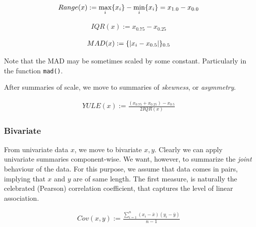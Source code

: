 \documentclass[12pt,a4paper]{report}
\begin{document}
\begin{definition}
\begin{align}
	Range(x):= \max_i\{ x_i \}-\min_i\{ x_i \}= x_{1.0}-x_{0.0}
\end{align}
\end{definition}

\begin{definition}
\begin{align}
	IQR(x):= x_{0.75}-x_{0.25}
\end{align}
\end{definition}



\begin{definition}
\begin{align}
	MAD(x):= \{ |x_i-x_{0.5}| \}_{0.5}
\end{align}
\end{definition}
Note that the MAD may be sometimes scaled by some constant. Particularly in the \R function \texttt{mad()}. 


After summaries of scale, we move to summaries of \emph{skewness}, or \emph{asymmetry}.

\begin{definition}
\begin{align}
	YULE(x):= \frac{(x_{0.75}+x_{0.25})-x_{0.5}}{2 IQR(x)}
\end{align}
\end{definition}

 


\subsubsection{Bivariate}
From univariate data $x$, we move to bivariate $x,y$.
Clearly we can apply univariate summaries component-wise. 
We want, however, to summarize the \emph{joint} behaviour of the data. 
For this purpose, we assume that data comes in pairs, implying that $x$ and $y$ are of same length.
The first measure, is naturally the celebrated (Pearson) correlation coefficient, that captures the level of linear association.


\begin{definition}
\begin{align}
	Cov(x,y):= \frac{\sum_{i=1}^{n} (x_i-\bar{x})(y_i-\bar{y})}{n-1}
\end{align}
\end{definition}
\end{document}
